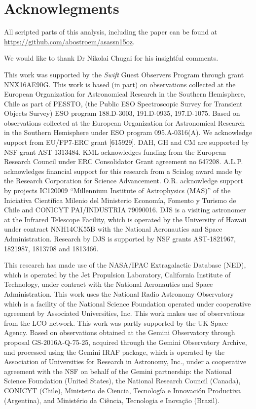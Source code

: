 \documentclass[a4paper,fleqn,usenatbib]{mnras}
\begin{document}
\section*{Acknowlegments}
All scripted parts of this analysis, including the paper can be found at \hyperlink{https://github.com/abostroem/asassn15oz}{https://github.com/abostroem/asassn15oz}.

We would like to thank Dr Nikolai Chugai for his insightful comments.

This work was supported by the {\it Swift} Guest Observers Program through grant NNX16AE90G.
This work is based (in part) on observations collected at the European Organization for Astronomical Research in the Southern Hemisphere, Chile as part of PESSTO, (the Public ESO Spectroscopic Survey for Transient Objects Survey) ESO program 188.D-3003, 191.D-0935, 197.D-1075.
Based on observations collected at the European Organization for Astronomical Research in the Southern Hemisphere under ESO program 095.A-0316(A). 
We acknowledge support from EU/FP7-ERC grant [615929].
DAH, GH and CM are supported by NSF grant AST-1313484.
KML acknowledges funding from the European Research Council under ERC Consolidator Grant agreement no 647208.
A.L.P. acknowledges financial support for this research from a Scialog award made by the Research Corporation for Science Advancement.
O.R. acknowledge support by projects IC120009 ``Millennium Institute of Astrophysics (MAS)'' of the Iniciativa Cient\'ifica Milenio del Ministerio Econom\'ia, Fomento y Turismo de Chile and CONICYT PAI/INDUSTRIA 79090016. 
DJS is a visiting astronomer at the Infrared Telescope Facility, which is operated by the University of Hawaii under contract NNH14CK55B with the National Aeronautics and Space Administration.
Research by DJS is supported by NSF grants AST-1821967, 1821987, 1813708 and 1813466.

This research has made use of the NASA/IPAC Extragalactic Database (NED), which is operated by the Jet Propulsion Laboratory, California Institute of Technology, under contract with the National Aeronautics and Space Administration.
This work uses the National Radio Astronomy Observatory which is a facility of the National Science Foundation operated under cooperative agreement by Associated Universities, Inc.
This work makes use of observations from the LCO network. 
This work was partly supported by the UK Space Agency.
Based on observations obtained at the Gemini Observatory through proposal GS-2016A-Q-75-25, acquired through the Gemini Observatory Archive, and processed using the Gemini IRAF package, which is operated by the Association of Universities for Research in Astronomy, Inc., under a cooperative agreement with the NSF on behalf of the Gemini partnership: the National Science Foundation (United States), the National Research Council (Canada), CONICYT (Chile), Ministerio de Ciencia, Tecnolog\'{i}a e Innovaci\'{o}n Productiva (Argentina), and Minist\'{e}rio da Ci\^{e}ncia, Tecnologia e Inova\c{c}\~{a}o (Brazil).
\end{document}
